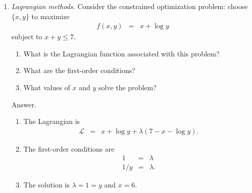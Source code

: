 \documentclass[11pt]{article}
\begin{document}
\begin{enumerate}
\item {\it Lagrangian methods.\/}
Consider the constrained optimization problem:  choose $\{x,y\}$
to maximize
\begin{eqnarray*}
    f(x,y) &=& x + \log y
\end{eqnarray*}
subject to $ x + y \leq 7$.
%
\begin{enumerate}
\item What is the Lagrangian function associated with this problem?
\item What are the first-order conditions?
\item What values of $x$ and $y$ solve the problem?
\end{enumerate}
%
Answer.
\begin{enumerate}
\item The Lagrangian is
\begin{eqnarray*}
    \mathcal{L} &=& x + \log y  + \lambda (7 - x - \log y ).
\end{eqnarray*}
\item The first-order conditions are
\begin{eqnarray*}
    1 &=& \lambda \\
    1/y &=& \lambda .
\end{eqnarray*}
\item The solution is $\lambda = 1 = y$ and $x = 6$.
\end{enumerate}


\end{enumerate}
\end{document}

